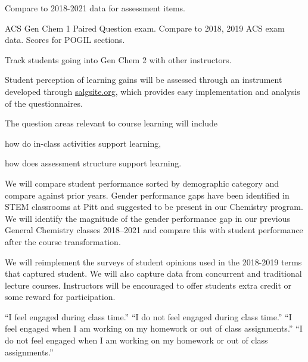 \documentclass[10pt,letterpaper]{article}
\begin{document}
\subaim{}



%
%


 Compare to 2018-2021 data for assessment items.

 ACS Gen Chem 1 Paired Question exam.  Compare to 2018, 2019 ACS exam data. Scores for POGIL sections.

 Track students going into Gen Chem 2 with other instructors. 

Student perception of learning gains will be assessed through an instrument developed through \url{salgsite.org}, which provides easy implementation and analysis of the questionnaires. 

The question areas relevant to course learning will include
\begin{enumerate*}[label=\textbf{\arabic*.)}]
  \item how do in-class activities support learning,
\item how does assessment structure support learning.
\end{enumerate*}

 We will compare student performance sorted by demographic category and compare against prior years. Gender performance gaps have been identified in STEM classrooms at Pitt and suggested to be present in our Chemistry program. We will identify the magnitude of the gender performance gap in our previous General Chemistry classes 2018--2021 and compare this with student performance after the course transformation.

We will reimplement the surveys of student opinions used in the 2018-2019 terms that captured student.
We will also capture data from concurrent \pogil and traditional lecture courses. Instructors will be encouraged to offer students extra credit or some reward for participation.

``I feel engaged during class time.'' ``I do not feel engaged during class time.'' ``I feel engaged when I am working on my homework or out of class assignments.'' ``I do not feel engaged when I am working on my homework or out of class assignments.''
\end{document}
